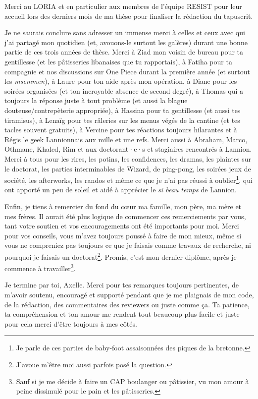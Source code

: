 Merci au LORIA et en particulier aux membres de l'équipe RESIST pour leur accueil lors des derniers mois de ma thèse pour finaliser la rédaction du tapuscrit.

Je ne saurais conclure sans adresser un immense merci à celles et ceux avec qui j'ai partagé mon quotidien (et, avouons-le surtout les galères) durant une bonne partie de ces trois années de thèse. Merci à Ziad mon voisin de bureau pour ta gentillesse (et les pâtisseries libanaises que tu rapportais), à Fatiha pour ta compagnie et nos discussions sur One Piece durant la première année (et surtout les \textit{msemmen}), à Laure pour ton aide après mon opération, à Diane pour les soirées organisées (et ton incroyable absence de second degré), à Thomas qui a toujours la réponse juste à tout problème (et aussi la blague douteuse/contrepèterie appropriée), à Hassina pour ta gentillesse (et aussi tes tiramisus), à Lenaïg pour tes râleries sur les menus végés de la cantine (et tes tacles souvent gratuits), à Vercine pour tes réactions toujours hilarantes et à Régis le geek Lannionnais aux mille et une refs. Merci aussi à Abraham, Marco, Othmane, Khaled, Rim et aux doctorant·e·s et stagiaires rencontrés à Lannion. Merci à tous pour les rires, les potins, les confidences, les dramas, les plaintes sur le doctorat, les parties interminables de Wizard, de ping-pong, les soirées jeux de société, les afterworks, les randos et même ce que je n'ai pas réussi à oublier\footnote{Je parle de ces parties de baby-foot assaisonnées des piques de la bretonne.}, qui ont apporté un peu de soleil et aidé à apprécier le \textit{si beau temps} de Lannion.


Enfin, je tiens à remercier du fond du cœur ma famille, mon père, ma mère et mes frères. Il aurait été plus logique de commencer ces remerciements par vous, tant votre soutien et vos encouragements ont été importants pour moi. Merci pour vos conseils, vous m'avez toujours poussé à faire de mon mieux, même si vous ne compreniez pas toujours ce que je faisais comme travaux de recherche, ni pourquoi je faisais un doctorat\footnote{J'avoue m'être moi aussi parfois posé la question.}. Promis, c'est mon dernier diplôme, après je commence à travailler\footnote{Sauf si je me décide à faire un CAP boulanger ou pâtissier, vu mon amour à peine dissimulé pour le pain et les pâtisseries.}.

Je termine par toi, Axelle. Merci pour tes remarques toujours pertinentes, de m'avoir soutenu, encouragé et supporté pendant que je me plaignais de mon code, de la rédaction, des commentaires des reviewers ou juste comme ça. Ta patience, ta compréhension et ton amour me rendent tout beaucoup plus facile et juste pour cela merci d'être toujours à mes côtés.
